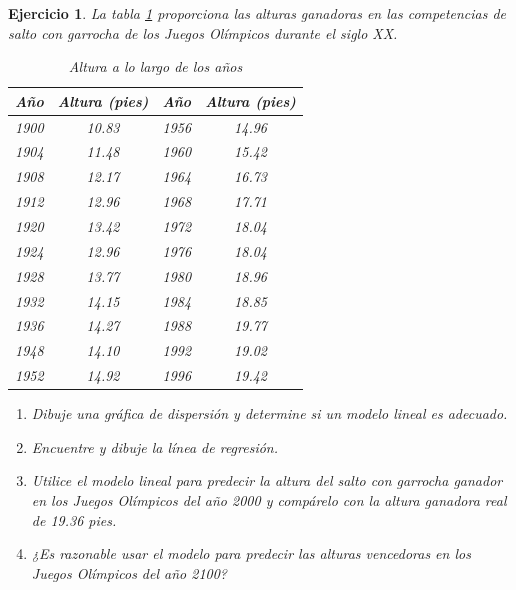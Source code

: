 \documentclass[12pt,tikz,border=5pt]{article}
\newtheorem{ejercicio}{Ejercicio}[section]
\begin{document}
\begin{ejercicio}
  La tabla \ref{tabla:saltoGarrocha} proporciona las alturas ganadoras en las competencias de salto con garrocha de los Juegos Olímpicos durante el siglo XX.
  
\begin{table}[!hb]
    \centering
    \begin{tabular}{cccc}
        \toprule
        \textbf{Año} & \textbf{Altura (pies)} & \textbf{Año} & \textbf{Altura (pies)} \\
        \midrule
        1900 & 10.83 & 1956 & 14.96 \\
        1904 & 11.48 & 1960 & 15.42 \\
        1908 & 12.17 & 1964 & 16.73 \\
        1912 & 12.96 & 1968 & 17.71 \\
        1920 & 13.42 & 1972 & 18.04 \\
        1924 & 12.96 & 1976 & 18.04 \\
        1928 & 13.77 & 1980 & 18.96 \\
        1932 & 14.15 & 1984 & 18.85 \\
        1936 & 14.27 & 1988 & 19.77 \\
        1948 & 14.10 & 1992 & 19.02 \\
        1952 & 14.92 & 1996 & 19.42 \\
        \bottomrule
    \end{tabular}
    \caption{Altura a lo largo de los años}
    \label{tabla:saltoGarrocha}
\end{table}

\begin{enumerate}[label=(\alph*)]
  \item Dibuje una gráfica de dispersión y determine si un modelo lineal es adecuado.
  \item Encuentre y dibuje la línea de regresión.
  \item Utilice el modelo lineal para predecir la altura del salto con garrocha ganador en los Juegos Olímpicos del año 2000 y compárelo con la altura ganadora real de 19.36 pies.
  \item ¿Es razonable usar el modelo para predecir las alturas vencedoras en los Juegos Olímpicos del año 2100?
\end{enumerate}
\end{ejercicio}



\end{document}
